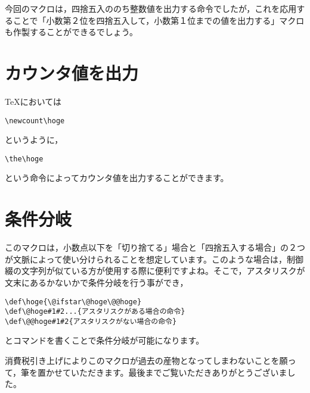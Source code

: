 \documentclass[autodetect-engine,dvipdfmx]{jsarticle}
\begin{document}
今回のマクロは，四捨五入ののち整数値を出力する命令でしたが，これを応用することで「小数第２位を四捨五入して，小数第１位までの値を出力する」マクロも作製することができるでしょう。

\section{カウンタ値を出力}

\TeX においては

\begin{tcolorbox}

\begin{verbatim}
\newcount\hoge
\end{verbatim}

\end{tcolorbox}

というように\verb@{}，

\begin{tcolorbox}

\begin{verbatim}
\the\hoge
\end{verbatim}

\end{tcolorbox}

という命令によってカウンタ値を出力することができます。

\section{条件分岐}

このマクロは，小数点以下を「切り捨てる」場合と「四捨五入する場合」の２つが文脈によって使い分けられることを想定しています。このような場合は，制御綴の文字列が似ている方が使用する際に便利ですよね。そこで，アスタリスクが文末にあるかないかで条件分岐を行う事ができ，

\begin{tcolorbox}

\begin{verbatim}
\def\hoge{\@ifstar\@hoge\@@hoge}
\def\@hoge#1#2...{アスタリスクがある場合の命令}
\def\@@hoge#1#2{アスタリスクがない場合の命令}
\end{verbatim}

\end{tcolorbox}

とコマンドを書くことで条件分岐が可能になります。

消費税引き上げによりこのマクロが過去の産物となってしまわないことを願って，筆を置かせていただきます。最後までご覧いただきありがとうございました。
\end{document}
